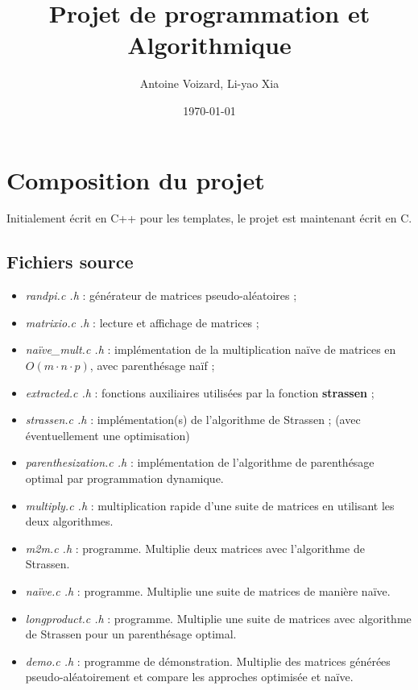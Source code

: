 \documentclass[a4paper]{article}
\begin{document}
\title{Projet de programmation et Algorithmique}
\author{Antoine Voizard, Li-yao Xia}
\date{\today}

\maketitle

\section{Composition du projet}

Initialement écrit en C++ pour les templates, le projet est maintenant
écrit en C.

\subsection{Fichiers source}

\begin{itemize}
  \item {\it randpi.c .h} : générateur de matrices pseudo-aléatoires ;
  \item {\it matrixio.c .h} : lecture et affichage de matrices ;
  \item {\it naïve\_mult.c .h} : implémentation de la multiplication naïve
  de matrices en $O(m \cdot n \cdot p)$, avec parenthésage naïf ;
  \item {\it extracted.c .h} : fonctions auxiliaires utilisées par
  la fonction {\bf strassen} ;
  \item {\it strassen.c .h} : implémentation(s) de l'algorithme de
  Strassen ; (avec éventuellement une optimisation)
  \item {\it parenthesization.c .h} : implémentation de l'algorithme de
  parenthésage optimal par programmation dynamique.
  \item {\it multiply.c .h} : multiplication rapide d'une suite de
  matrices en utilisant les deux algorithmes.
  \item {\it m2m.c .h} : programme. Multiplie deux matrices avec
  l'algorithme de Strassen.
  \item {\it naïve.c .h} : programme. Multiplie une suite de matrices
  de manière naïve.
  \item {\it longproduct.c .h} : programme. Multiplie une suite de
  matrices avec algorithme de Strassen pour un parenthésage optimal.
  \item {\it demo.c .h} : programme de démonstration. Multiplie des
  matrices générées pseudo-aléatoirement et compare les approches
  optimisée et naïve.
\end{itemize}
\end{document}
